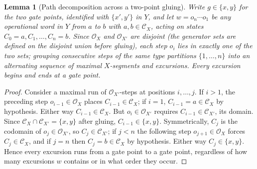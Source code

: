 \documentclass[11pt]{article}
\newtheorem{lemma}[theorem]{Lemma}
\theoremstyle{remark}
\newcommand{\C}{\mathcal{C}}
\newcommand{\Ops}{\mathcal{O}}
\begin{document}
\begin{lemma}[Path decomposition across a two-point gluing]\label{lem:pathdecomp}
Write $g\in\{x,y\}$ for the two gate points, identified with
$\{x',y'\}$ in $Y$, and let $w=o_n\cdots o_1$ be any operational word
in $Y$ from $a$ to $b$ with $a,b\in\C_X$, acting on states
$C_0=a,C_1,\dots,C_n=b$. Since $\Ops_X$ and $\Ops_{X'}$ are disjoint
(the generator sets are defined on the disjoint union before
gluing), each step $o_i$ lies in exactly one of the two sets; grouping
consecutive steps of the same type partitions $\{1,\dots,n\}$ into an
alternating sequence of maximal \emph{$X$-segments} and
\emph{excursions}. Every excursion begins and ends at a gate point.
\end{lemma}

\begin{proof}
Consider a maximal run of $\Ops_{X'}$-steps at positions
$i,\dots,j$. If $i>1$, the preceding step $o_{i-1}\in\Ops_X$ places
$C_{i-1}\in\C_X$; if $i=1$, $C_{i-1}=a\in\C_X$ by hypothesis. Either
way $C_{i-1}\in\C_X$. But $o_i\in\Ops_{X'}$ requires
$C_{i-1}\in\C_{X'}$, its domain. Since $\C_X\cap\C_{X'}=\{x,y\}$ after
gluing, $C_{i-1}\in\{x,y\}$. Symmetrically, $C_j$ is the codomain of
$o_j\in\Ops_{X'}$, so $C_j\in\C_{X'}$; if $j<n$ the following step
$o_{j+1}\in\Ops_X$ forces $C_j\in\C_X$, and if $j=n$ then $C_j=b\in\C_X$
by hypothesis. Either way $C_j\in\{x,y\}$. Hence every excursion runs
from a gate point to a gate point, regardless of how many excursions
$w$ contains or in what order they occur.
\end{proof}
\end{document}
